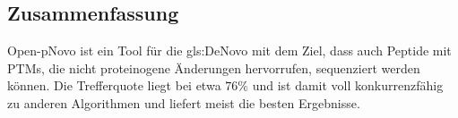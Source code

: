 \documentclass[a4paper, 12pt]{article}
\begin{document}
\subsection{Zusammenfassung}
Open-pNovo ist ein Tool für die \gls{gls:DeNovo} mit dem Ziel, dass auch Peptide mit PTMs, die nicht proteinogene Änderungen hervorrufen, sequenziert werden können. Die Trefferquote liegt bei etwa $ 76 \% $ und ist damit voll konkurrenzfähig zu anderen Algorithmen und liefert meist die besten Ergebnisse.

\begingroup
\printbibliography
\endgroup
\end{document}
